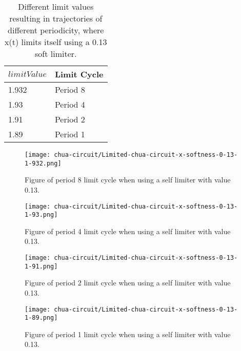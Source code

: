 \documentclass[main]{subfiles}
\begin{document}
\begin{table}[H]
\renewcommand{\arraystretch}{1.2}
\center
\begin{tabular}{@{}ll@{}}
	\toprule
   \(limitValue\) & Limit Cycle\\
   \midrule
   1.932 & Period 8 \\ 
   1.93 & Period 4 \\
   1.91  & Period 2 \\
   1.89 & Period 1 \\
   \bottomrule
\end{tabular}
\caption[Limiter values for periodic trajectories for for an x self-limiting limiter with softness 0.13]{Different limit values resulting in trajectories of different periodicity, where x(t) limits itself using a 0.13 soft limiter.}
\label{table:x-0.13-periodicities}
\end{table}

\begin{figure}[H]
\centering
\texttt{[image: chua-circuit/Limited-chua-circuit-x-softness-0-13-1-932.png]}
\caption[Figure of period 8 limit cycle using self limiting 0.13 soft limiter.]{Figure of period 8 limit cycle when using a self limiter with value 0.13.}
\label{figure:x-0.13-8-limit-cycle-trajectory}
\end{figure}

\begin{figure}[H]
\centering
\texttt{[image: chua-circuit/Limited-chua-circuit-x-softness-0-13-1-93.png]}
\caption[Figure of period 4 limit cycle using self limiter 0.13 soft limiter..]{Figure of period 4 limit cycle when using a self limiter with value 0.13.}
\label{figure:x-0.13-4-limit-cycle-trajectory}
\end{figure}

\begin{figure}[H]
\centering
\texttt{[image: chua-circuit/Limited-chua-circuit-x-softness-0-13-1-91.png]}
\caption[Figure of period 2 limit cycle using self limiter 0.13 soft limiter.]{Figure of period 2 limit cycle when using a self limiter with value 0.13.}
\label{figure:x-0.13-2-limit-cycle-trajectory}
\end{figure}

\begin{figure}[H]
\centering
\texttt{[image: chua-circuit/Limited-chua-circuit-x-softness-0-13-1-89.png]}
\caption[Figure of period 1 limit cycle using self limiter 0.13 soft limiter.]{Figure of period 1 limit cycle when using a self limiter with value 0.13.}
\label{figure:x-0.13-1-limit-cycle-trajectory}
\end{figure}
\end{document}
